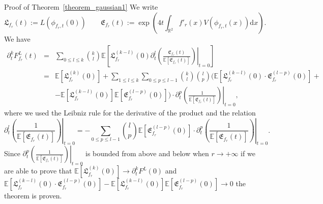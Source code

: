 \documentclass[a4paper,10pt]{article}
\newcommand{\assign}{:=}
\newcommand{\mathd}{\mathrm{d}}
\newcommand{\nobracket}{}
\newenvironment{proof*}[1]{\noindent\textbf{#1\ }}{\hspace*{\fill}$\Box$\medskip}
\begin{document}
\begin{proof*}{Proof of Theorem~\ref{theorem_gaussian1}}
  We write
  \[ \mathfrak{L}_{f_r} (t) \assign L (\phi_{f_r, t} (0)) \qquad
     \mathfrak{E}_{f_r} (t) \assign \exp \left( 4 t \int_{\mathbb{R}^2} f'_r
     (x) V (\phi_{f_r, t} (x)) \mathd x \right) . \]
  We have
  \begin{eqnarray*}
    \partial^k_t F^L_{f_r} (t) & = & \sum_{0 \leqslant l \leqslant k}
    \binom{k}{l} \mathbb{E} \left[ \mathfrak{L}_{f_r}^{(k - l)} (0) \left.
    \partial^l_t \left( \frac{\mathfrak{E}_{f_r} (t)}{\mathbb{E}
    [\mathfrak{E}_{f_r} (t)]} \right) \right|_{t = 0} \right]\\
    & = & \mathbb{E} [\mathfrak{L}_{f_r}^{(k)} (0) \mathfrak{}] + \sum_{1
    \leqslant l \leqslant k} \sum_{0 \leqslant p \leqslant l - 1} \binom{k}{l}
    \binom{l}{p} (\mathbb{E}[\mathfrak{L}^{(k - l)}_{f_r} (0) \cdot
    \mathfrak{E}^{(l - p)}_{f_r} (0)] + \nobracket\\
    &  & \nobracket -\mathbb{E}[\mathfrak{L}^{(k - l)}_{f_r}
    (0)]\mathbb{E}[\mathfrak{E}^{(l - p)}_{f_r} (0)]) \cdot \left.
    \partial^p_t \left( \frac{1}{\mathbb{E} [\mathfrak{E}_{f_r} (t)]} \right)
    \right|_{t = 0},
  \end{eqnarray*}
  where we used the Leibniz rule for the derivative of the product and the
  relation
  \[ \left. \partial^l_t \left( \frac{1}{\mathbb{E} [\mathfrak{E}_{f_r} (t)]}
     \right) \right|_{t = 0} = - \sum_{0 \leqslant p \leqslant l - 1}
     \binom{l}{p} \mathbb{E} [\mathfrak{E}^{(l - p)}_{f_r} (0)] \cdot \left.
     \partial^p_t \left( \frac{1}{\mathbb{E} [\mathfrak{E}_{f_r} (t)]} \right)
     \right|_{t = 0} . \]
  Since $\left. \partial^p_t \left( \frac{1}{\mathbb{E} [\mathfrak{E}_{f_r}
  (t)]} \right) \right|_{t = 0}$ is bounded from above and below when $r
  \rightarrow + \infty$ if we are able to prove that $\mathbb{E}
  [\mathfrak{L}_{f_r}^{(k)} (0) \mathfrak{}] \rightarrow \partial^k_t F^L (0)$
  and $\mathbb{E} [\mathfrak{L}^{(k - l)}_{f_r} (0) \cdot \mathfrak{E}^{(l -
  p)}_{f_r} (0)] -\mathbb{E} [\mathfrak{L}^{(k - l)}_{f_r} (0)] \mathbb{E}
  [\mathfrak{E}^{(l - p)}_{f_r} (0)] \rightarrow 0$ the theorem is proven.
  

\end{proof*}
\end{document}
